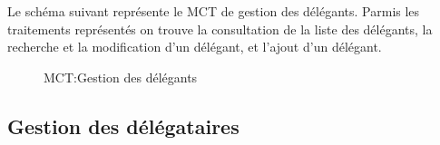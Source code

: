\documentclass[a4paper]{report}
\begin{document}
\begin{doublespace}
	Le schéma suivant représente le MCT de gestion des délégants. Parmis les traitements représentés
	on trouve la consultation de la liste des délégants, la recherche et la modification d'un délégant,
	et l'ajout d'un délégant.
	\begin{figure}[H]
		\begin{center}
			\caption{MCT:Gestion des délégants}
		\end{center}
	\end{figure}

	\subsection{Gestion des délégataires}


\end{doublespace}
\end{document}
